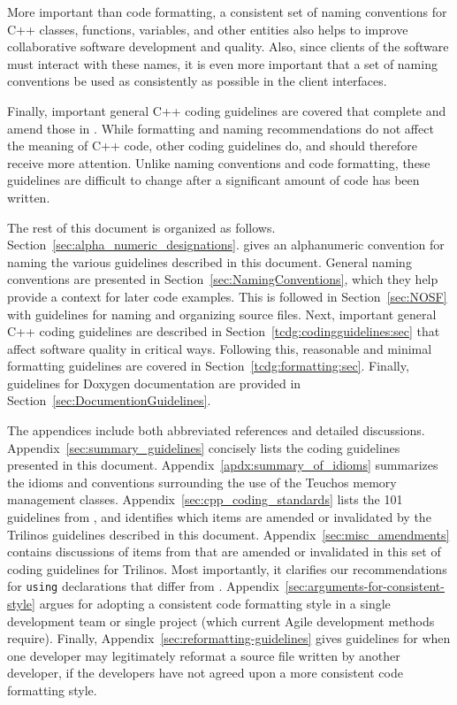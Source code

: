 More important than code formatting, a consistent set of naming
conventions for C++ classes, functions, variables, and other entities
also helps to improve collaborative software development and quality.
Also, since clients of the software must interact with these names, it
is even more important that a set of naming conventions be used as
consistently as possible in the client interfaces.

Finally, important general C++ coding guidelines are covered that
complete and amend those in {}\cite{C++CodingStandards05}.  While
formatting and naming recommendations do not affect the meaning of C++
code, other coding guidelines do, and should therefore receive more
attention.  Unlike naming conventions and code formatting, these
guidelines are difficult to change after a significant amount of code
has been written.

The rest of this document is organized as follows.
Section~\ref{sec:alpha_numeric_designations}.  gives an alphanumeric
convention for naming the various guidelines described in this
document.  General naming conventions are presented in
Section~\ref{sec:NamingConventions}, which they help provide a context
for later code examples.  This is followed in Section~\ref{sec:NOSF}
with guidelines for naming and organizing source files.  Next,
important general C++ coding guidelines are described in
Section~\ref{tcdg:codingguidelines:sec} that affect software quality
in critical ways.  Following this, reasonable and minimal formatting
guidelines are covered in Section~\ref{tcdg:formatting:sec}.  Finally,
guidelines for Doxygen documentation are provided in
Section~\ref{sec:DocumentionGuidelines}.

The appendices include both abbreviated references and detailed
discussions.  Appendix~\ref{sec:summary_guidelines} concisely lists
the coding guidelines presented in this document.
Appendix~\ref{apdx:summary_of_idioms} summarizes the idioms and
conventions surrounding the use of the Teuchos memory management
classes.  Appendix~\ref{sec:cpp_coding_standards} lists the 101
guidelines from {}\cite{C++CodingStandards05}, and identifies which
items are amended or invalidated by the Trilinos guidelines described
in this document.  Appendix~\ref{sec:misc_amendments} contains
discussions of items from {}\cite{C++CodingStandards05} that are
amended or invalidated in this set of coding guidelines for Trilinos.
Most importantly, it clarifies our recommendations for
{}\texttt{using} declarations that differ from {}\cite[Item
59]{C++CodingStandards05}.
Appendix~\ref{sec:arguments-for-consistent-style} argues for adopting
a consistent code formatting style in a single development team or
single project (which current Agile development methods require).
Finally, Appendix~\ref{sec:reformatting-guidelines} gives guidelines
for when one developer may legitimately reformat a source file written
by another developer, if the developers have not agreed upon a more
consistent code formatting style.

